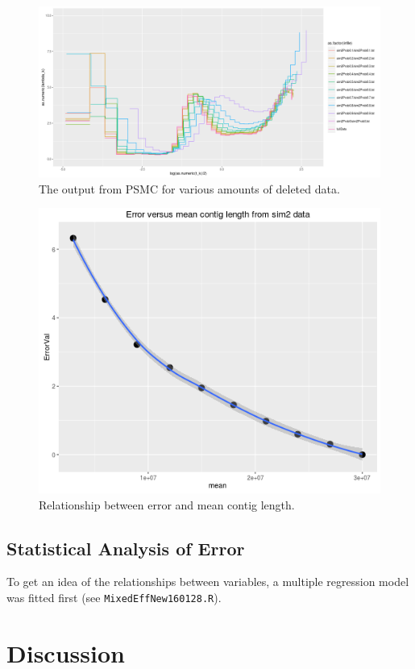 \documentclass[11pt,a4paper]{article}
\begin{document}
\begin{figure}[h]
  \center
  \includegraphics[width=1\linewidth]{figures/deletedDataPsmcPlots.png}
  \caption{The output from PSMC for various amounts of deleted data.}\label{deletedDataPsmcPlots}
\end{figure}

\begin{figure}[h]
  \center
  \includegraphics[width=.7\linewidth]{figures/sim2ErrorVsMeanContigLength.png}
  \caption{Relationship between error and mean contig length.}\label{sim2ErrorVsMeanContigLength}
\end{figure}

\subsection{Statistical Analysis of Error}
To get an idea of the relationships between variables, a multiple regression model was fitted first (see \verb|MixedEffNew160128.R|).

\section{Discussion}
\end{document}
